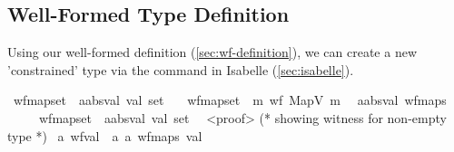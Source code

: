 \subsection{Well-Formed Type Definition}
\label{sec:constrained-types}

Using our well-formed definition (\ref{sec:wf-definition}),
we can create a new 'constrained' type
via the  command in Isabelle (\ref{sec:isabelle}).



\begin{isabellebody}\isanewline
\isamarkupfalse%
\ wf{\isacharunderscore}{\kern0pt}map{\isacharunderscore}{\kern0pt}set\ {\isacharcolon}{\kern0pt}{\isacharcolon}{\kern0pt}\ {\isachardoublequoteopen}{\isacharprime}{\kern0pt}a{\isacharcolon}{\kern0pt}{\isacharcolon}{\kern0pt}absval\ val{}{}{}\ set{\isachardoublequoteclose}\ \isanewline
\ \ {\isachardoublequoteopen}wf{\isacharunderscore}{\kern0pt}map{\isacharunderscore}{\kern0pt}set\ {\isacharequal}{\kern0pt}\ {\isacharbraceleft}{\kern0pt}m{\isachardot}{\kern0pt}\ wf\ {\isacharparenleft}{\kern0pt}MapV\ m{\isacharparenright}{\kern0pt}{\isacharbraceright}{\kern0pt}{\isachardoublequoteclose}
\isanewline\isanewline
\isamarkupfalse%
\ {\isacharparenleft}{\kern0pt}\ {\isacharprime}{\kern0pt}a{\isacharcolon}{\kern0pt}{\isacharcolon}{\kern0pt}absval\ wf{\isacharunderscore}{\kern0pt}maps\ 
\isanewline
\ \ \ \ {\isacharequal}{\kern0pt}\ {\isachardoublequoteopen}wf{\isacharunderscore}{\kern0pt}map{\isacharunderscore}{\kern0pt}set\ {\isacharcolon}{\kern0pt}{\isacharcolon}{\kern0pt}\ {\isacharprime}{\kern0pt}a{\isacharcolon}{\kern0pt}{\isacharcolon}{\kern0pt}absval\ val{}{}{}\ set{\isachardoublequoteclose}\isanewline
\ \ <proof> (* showing witness for non-empty type *)
\isanewline\isanewline
\isamarkupfalse%
\ {\isacharprime}{\kern0pt}a\ wf{\isacharunderscore}{\kern0pt}val\ {\isacharequal}{\kern0pt}\ {\isachardoublequoteopen}{\isacharparenleft}{\kern0pt}{\isacharprime}{\kern0pt}a{\isacharcomma}{\kern0pt}\ {\isacharprime}{\kern0pt}a\ wf{\isacharunderscore}{\kern0pt}maps{\isacharparenright}{\kern0pt}\ val{\isachardoublequoteclose}%
\end{isabellebody}


